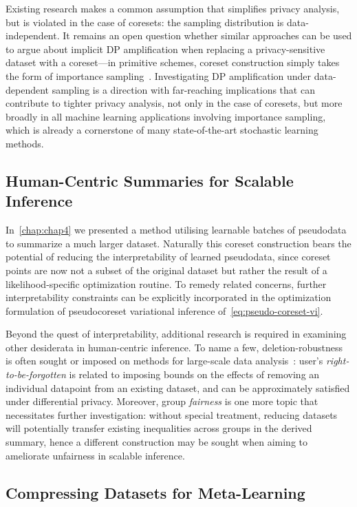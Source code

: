 Existing research makes a common assumption that simplifies privacy analysis, but is violated in the case of coresets: the sampling distribution is data-independent. It remains an open question whether similar approaches can be used to argue about implicit DP amplification when replacing a privacy-sensitive dataset with a coreset---in primitive schemes, coreset construction simply takes the form of importance sampling~\citep{bachem17}. Investigating DP amplification under data-dependent sampling is a direction with far-reaching implications that can contribute to tighter privacy analysis, not only in the case of coresets, but more broadly in all machine learning applications involving importance sampling, which is already a cornerstone of many state-of-the-art stochastic learning methods. 


\subsection{Human-Centric Summaries for Scalable Inference}
\label{subsec:human-centric-pseudodata}

In~\cref{chap:chap4} we presented a method utilising learnable batches of pseudodata to summarize a much larger dataset. Naturally this coreset construction bears the potential of reducing the interpretability of learned pseudodata, since coreset points are now not a subset of the original dataset but rather the result of a likelihood-specific optimization routine. To remedy related concerns, further interpretability constraints can be explicitly incorporated in the optimization formulation of pseudocoreset variational inference of~\cref{eq:pseudo-coreset-vi}.

Beyond the quest of interpretability, additional research is required in examining other desiderata in human-centric inference. To name a few, deletion-robustness is often sought or imposed on methods for large-scale data analysis~\citep{mirzasoleiman17, ginart19}: user's \emph{right-to-be-forgotten} is related to imposing bounds on the effects of removing an individual datapoint from an existing dataset, and can be approximately satisfied under differential privacy. Moreover, group \emph{fairness} is one more topic that necessitates further investigation: without special treatment, reducing datasets will potentially transfer existing inequalities across groups in the derived summary, hence a different construction may be sought when aiming to ameliorate unfairness in scalable inference.  

\subsection{Compressing Datasets for Meta-Learning}
\label{subsec:metacoresets}

